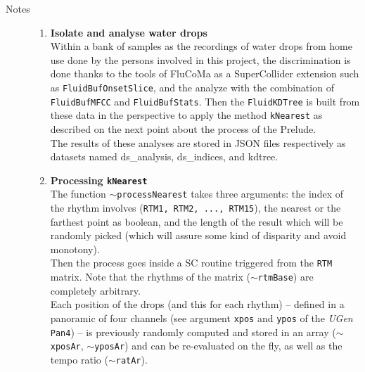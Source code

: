 \begin{description}
\item[Notes] \hfill 
\begin{enumerate}[label=\alph*)]
\item \textbf{Isolate and analyse water drops}\\ 
Within a bank of samples as the recordings of water drops from home use done by the persons involved in this project, the discrimination is done thanks to the tools of FluCoMa as a SuperCollider extension such as \texttt{FluidBufOnsetSlice}, and the analyze with the combination of  \texttt{FluidBufMFCC} and  \texttt{FluidBufStats}. Then the  \texttt{FluidKDTree} is built from these data in the perspective to apply the method  \texttt{kNearest} as described on the next point about the process of the Prelude.\\ 
The results of these analyses are stored in JSON files respectively as datasets named \textsf{ds\_analysis},  \textsf{ds\_indices}, and \textsf{kdtree}.
\item \textbf{Processing \texttt{kNearest}}\\ 
The function \texttt{$\sim$processNearest} takes three arguments: the index of the rhythm involves (\texttt{RTM1, RTM2, ..., RTM15}), the nearest or the farthest point as boolean, and the length of the result which will be randomly picked (which will assure some kind of disparity and avoid monotony).\\ 
 Then the process goes inside a SC routine triggered from the \texttt{RTM} matrix. Note that the rhythms of the matrix (\texttt{$\sim$rtmBase}) are completely arbitrary.\\ 
 Each position of the drops (and this for each rhythm) -- defined in a panoramic of four channels (see argument \texttt{xpos} and \texttt{ypos} of the \textit{UGen} \texttt{Pan4}) -- is previously randomly computed and stored in an array (\texttt{$\sim$xposAr}, \texttt{$\sim$yposAr}) and can be re-evaluated on the fly, as well as the tempo ratio (\texttt{$\sim$ratAr}).
\end{enumerate}

\end{description}


